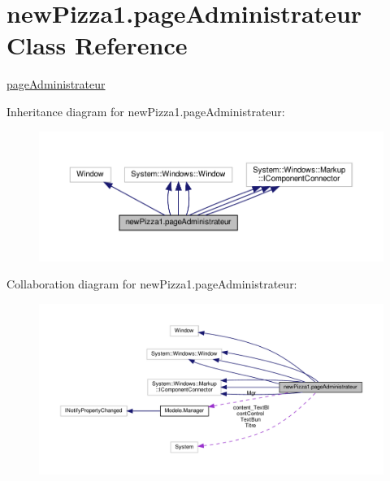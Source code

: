 \hypertarget{classnewPizza1_1_1pageAdministrateur}{}\section{new\+Pizza1.\+page\+Administrateur Class Reference}
\label{classnewPizza1_1_1pageAdministrateur}


\hyperlink{classnewPizza1_1_1pageAdministrateur}{page\+Administrateur}  




Inheritance diagram for new\+Pizza1.\+page\+Administrateur\+:
\nopagebreak
\begin{figure}[H]
\begin{center}
\leavevmode
\includegraphics[width=350pt]{classnewPizza1_1_1pageAdministrateur__inherit__graph}
\end{center}
\end{figure}


Collaboration diagram for new\+Pizza1.\+page\+Administrateur\+:
\nopagebreak
\begin{figure}[H]
\begin{center}
\leavevmode
\includegraphics[width=350pt]{classnewPizza1_1_1pageAdministrateur__coll__graph}
\end{center}
\end{figure}

